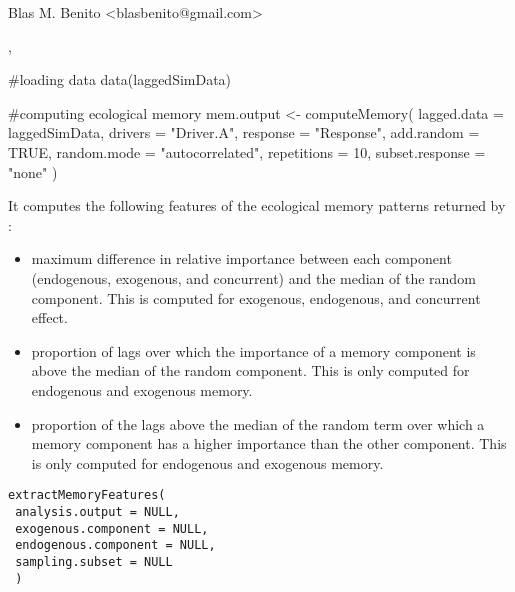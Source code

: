 \documentclass[letterpaper]{book}
\begin{document}
%
\begin{Author}\relax
Blas M. Benito  <blasbenito@gmail.com>
\end{Author}
%
\begin{SeeAlso}\relax
{}, 
\end{SeeAlso}
%
\begin{Examples}
\begin{ExampleCode}
#loading data
data(laggedSimData)

#computing ecological memory
mem.output <- computeMemory(
 lagged.data = laggedSimData,
 drivers = "Driver.A",
 response = "Response",
 add.random = TRUE,
 random.mode = "autocorrelated",
 repetitions = 10,
 subset.response = "none"
 )

\end{ExampleCode}
\end{Examples}
%
\begin{Description}\relax
It computes the following features of the ecological memory patterns returned by :
\begin{itemize}

\item {} maximum difference in relative importance between each component (endogenous, exogenous, and concurrent) and the median of the random component. This is computed for exogenous, endogenous, and concurrent effect.
\item {} proportion of lags over which the importance of a memory component is above the median of the random component. This is only computed for endogenous and exogenous memory.
\item {} proportion of the lags above the median of the random term over which a memory component has a higher importance than the other component. This is only computed for endogenous and exogenous memory.

\end{itemize}

\end{Description}
%
\begin{Usage}
\begin{verbatim}
extractMemoryFeatures(
 analysis.output = NULL,
 exogenous.component = NULL,
 endogenous.component = NULL,
 sampling.subset = NULL
 )
\end{verbatim}
\end{Usage}
\end{document}
